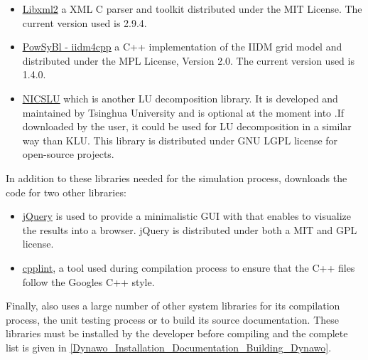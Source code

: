 \documentclass[a4paper, 12pt]{report}
\begin{document}
\begin{itemize}
\item \href{http://xmlsoft.org/}{\underline{Libxml2}} a XML C parser and toolkit distributed under the MIT License. The current version used is 2.9.4.

\item \href{https://www.powsybl.org/pages/documentation/developer/repositories/powsybl-iidm4cpp.html}{\underline{PowSyBl - iidm4cpp}} a C++ implementation of the IIDM grid model and distributed under the MPL License, Version 2.0. The current version used is 1.4.0.

\item \href{http://nicslu.weebly.com/} {\underline{NICSLU}} \cite{chenNicsLu} which is another LU decomposition library. It is developed and maintained by Tsinghua University and is optional at the moment into \Dynawo .If downloaded by the user, it could be used for LU decomposition in a similar way than KLU. This library is distributed under GNU LGPL license for open-source projects.
\end{itemize}

In addition to these libraries needed for the simulation process, \Dynawo downloads the code for two other libraries:
\begin{itemize}
\item \href{https://jquery.com/}{\underline{jQuery}} is used to provide a minimalistic GUI with \Dynawo that enables to visualize the results into a browser. jQuery is distributed under both a MIT and GPL license.
\item \href{https://github.com/google/styleguide/tree/gh-pages/cpplint}{\underline{cpplint}}, a tool used during \Dynawo compilation process to ensure that the C++ files follow the Google\textquotesingle s C++ style.
\end{itemize}

Finally, \Dynawo also uses a large number of other system libraries for its compilation process, the unit testing process or to build its source documentation. These libraries must be installed by the developer before compiling \Dynawo and the complete list is given in \ref{Dynawo_Installation_Documentation_Building_Dynawo}.



\end{document}
